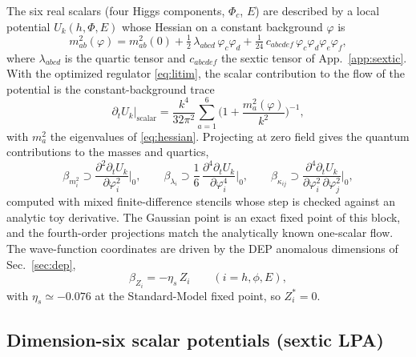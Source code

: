 \documentclass[11pt]{article}
\newcommand{\dt}{\partial_t}
\begin{document}
The six real scalars (four Higgs components, $\Phi_c$, $E$) are described by a
local potential $U_k(h,\Phi,E)$ whose Hessian on a constant background
$\varphi$ is
\begin{equation}
  \label{eq:hessian}
  m^2_{ab}(\varphi)=m^2_{ab}(0)
  +\tfrac12\,\lambda_{abcd}\,\varphi_c\varphi_d
  +\tfrac{1}{24}\,c_{abcdef}\,\varphi_c\varphi_d\varphi_e\varphi_f ,
\end{equation}
where $\lambda_{abcd}$ is the quartic tensor and $c_{abcdef}$ the sextic
tensor of App.~\ref{app:sextic}.  With the optimized regulator
\eqref{eq:litim}, the scalar contribution to the flow of the potential is the
constant-background trace
\begin{equation}
  \label{eq:trace}
  \dt U_k\big|_{\mathrm{scalar}}
  =\frac{k^4}{32\pi^2}\sum_{a=1}^{6}\Big(1+\frac{m^2_a(\varphi)}{k^2}\Big)^{-1},
\end{equation}
with $m^2_a$ the eigenvalues of \eqref{eq:hessian}.  Projecting at zero field
gives the quantum contributions to the masses and quartics,
\begin{equation}
  \label{eq:quarticprojections}
  \beta_{m_i^2}\supset \frac{\partial^2 \dt U_k}{\partial \varphi_i^2}\Big|_0,\qquad
  \beta_{\lambda_i}\supset \frac{1}{6}\,\frac{\partial^4 \dt U_k}
  {\partial \varphi_i^4}\Big|_0,\qquad
  \beta_{\kappa_{ij}}\supset \frac{\partial^4 \dt U_k}
  {\partial \varphi_i^2\,\partial\varphi_j^2}\Big|_0 ,
\end{equation}
computed with mixed finite-difference stencils whose step is checked against
an analytic toy derivative.  The Gaussian point is an exact fixed point of
this block, and the fourth-order projections match the analytically known
one-scalar flow.  The wave-function coordinates are driven by the DEP
anomalous dimensions of Sec.~\ref{sec:dep},
\begin{equation}
  \label{eq:Zflow}
  \beta_{Z_i}=-\eta_s\,Z_i \qquad (i=h,\phi,E),
\end{equation}
with $\eta_s\simeq -0.076$ at the Standard-Model fixed point, so $Z_i^*=0$.

\subsection{Dimension-six scalar potentials (sextic LPA)}
\label{sec:sextic}
\end{document}
